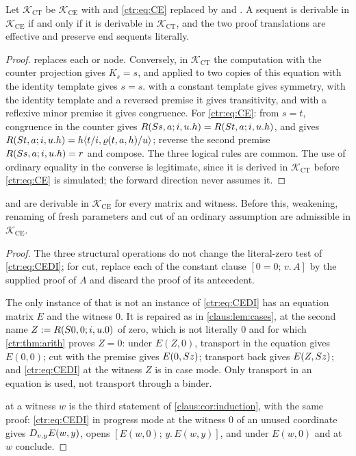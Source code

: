 \begin{theorem}\label{ctr:thm:interface}
Let $\mathcal K_{\mathrm{CT}}$ be $\mathcal K_{\mathrm{CE}}$ with  and
\eqref{ctr:eq:CE} replaced by  and . A sequent is derivable in
$\mathcal K_{\mathrm{CE}}$ if and only if it is derivable in $\mathcal K_{\mathrm{CT}}$, and
the two proof translations are effective and preserve end sequents literally.
\end{theorem}
\begin{proof}
 replaces each  or  node. Conversely, in
$\mathcal K_{\mathrm{CT}}$ the computation with the counter projection gives $K_s=s$, and
 applied to two copies of this equation with the identity template gives
$s=s$.  with a constant template gives symmetry, with the identity template
and a reversed premise it gives transitivity, and with a reflexive minor premise it gives
congruence. For \eqref{ctr:eq:CE}: from $s=t$, congruence in the counter gives
$R(S s,a;i,u.h)=R(S t,a;i,u.h)$, and  gives
$R(S t,a;i,u.h)=h\langle t/i,\varrho(t,a,h)/u\rangle$; reverse the second premise
$R(S s,a;i,u.h)=r$ and compose. The three logical rules are common. The use of ordinary
equality in the converse is legitimate, since it is derived in $\mathcal K_{\mathrm{CT}}$
before \eqref{ctr:eq:CE} is simulated; the forward direction never assumes it.
\end{proof}

\begin{lemma}\label{ctr:lem:ceintro}
 and  are derivable in $\mathcal K_{\mathrm{CE}}$ for every
matrix and witness. Before this, weakening, renaming of fresh parameters and cut of an
ordinary assumption are admissible in $\mathcal K_{\mathrm{CE}}$.
\end{lemma}
\begin{proof}
The three structural operations do not change the literal-zero test of
\eqref{ctr:eq:CEDI}; for cut, replace each  of the constant clause
$[0=0;\,v.\,A]$ by the supplied proof of $A$ and discard the proof of its antecedent.

The only instance of  that is not an instance of \eqref{ctr:eq:CEDI} has an
equation matrix $E$ and the witness $0$. It is repaired as in \cref{claus:lem:cases}, at
the second name $Z\mathrel{:=} R(S 0,0;i,u.0)$ of zero, which is not literally $0$ and for
which \cref{ctr:thm:arith} proves $Z=0$: under $E(Z,0)$, transport in the equation gives
$E(0,0)$; cut with the premise gives $E(0,S z)$; transport back gives $E(Z,S z)$; and
\eqref{ctr:eq:CEDI} at the witness $Z$ is in case mode. Only transport in an equation is
used, not transport through a binder.

 at a witness $w$ is the third statement of \cref{claus:cor:induction}, with
the same proof: \eqref{ctr:eq:CEDI} in progress mode at the witness $0$ of an unused
coordinate gives $D_{v,y}E(w,y)$,  opens $[E(w,0);\,y.\,E(w,y)]$, and under
$E(w,0)$  and  at $w$ conclude.
\end{proof}

